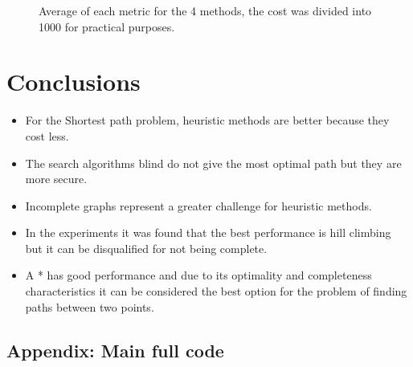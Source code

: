 \documentclass[11pt]{article}
\begin{document}
\begin{figure}[ht]
\centering
{}
\caption{Average of each metric for the 4 methods, the cost was divided into 1000 for practical purposes.}
\end{figure}
\section{Conclusions}
\begin{itemize}
    \item For the Shortest path problem, heuristic methods are better because they cost less.
    \item The search algorithms blind do not give the most optimal path but they are more secure.
    \item Incomplete graphs represent a greater challenge for heuristic methods.
    \item In the experiments it was found that the best performance is hill climbing but it can be disqualified for not being complete.
    \item A * has good performance and due to its optimality and completeness characteristics it can be considered the best option for the problem of finding paths between two points.
\end{itemize}



\clearpage

\begin{appendices}
  \section{Appendix: Main full code}
  \label{appendix:main}
  
\end{appendices}

\end{document}
